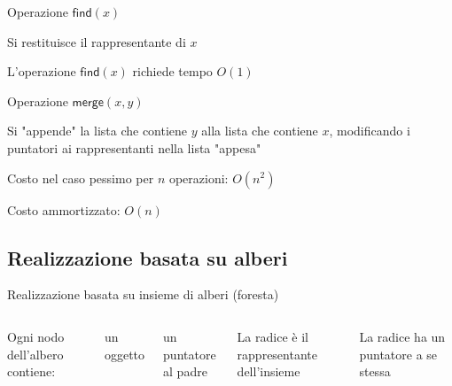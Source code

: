 \begin{frame}{Operazione $\textsf{find}(x)$}

\BIL
\item Si restituisce il rappresentante di $x$
\item L'operazione $\textsf{find}(x)$ richiede tempo $O(1)$
\EIL

\bigskip
{}

\end{frame}


\begin{frame}{Operazione $\textsf{merge}(x,y)$}

\BIL
\item Si "appende" la lista che contiene $y$ alla lista che contiene $x$, modificando
i puntatori ai rappresentanti nella lista "appesa"
\item Costo nel caso pessimo per $n$ operazioni: $O(n^2)$
\item Costo ammortizzato: $O(n)$
\EIL


\end{frame}

\subsection{Realizzazione basata su alberi}

\begin{frame}{Realizzazione basata su insieme di alberi (foresta)}


\begin{columns}[T]
\BIL
\item Ogni nodo dell'albero contiene:
  \BI
  \item un oggetto
  \item un puntatore al padre
  \EI
\item La radice è il rappresentante dell'insieme
\item La radice ha un puntatore a se stessa
\EIL
{}
\end{columns}

\end{frame}



